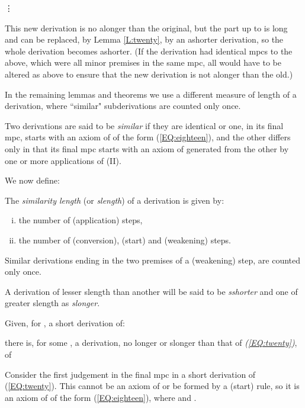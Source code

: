 \documentclass{LMCS}
\begin{document}
\begin{thm}
{{\hspace {7cm}\vdots

}

 \noindent This new derivation is no alonger than the original, but
  the part up to 
  is long and can be replaced, by Lemma \ref{L:twenty}, by an ashorter
  derivation, so the whole derivation becomes ashorter. (If the
  derivation had identical mpcs to the above, which were all minor
  premises in the same mpc, all would have to be altered as above to
  ensure that the new derivation is not alonger than the old.)

  In the remaining lemmas and theorems we use a different measure of
  length of a derivation, where ``similar" subderivations are counted
  only once.

\begin{defi}[Similar]\label{D:sim}
  Two derivations are said to be  \emph{similar} if they are identical
  or one, in its final mpc, starts with an axiom of  of
  the form (\ref{EQ:eighteen}), and the other differs only in that its
  final mpc starts with an axiom of  generated from the
  other by one or more applications of (II).
\end{defi}

  We now define:

\begin{defi}\label{D:simlen}
  The  \emph{similarity length} (or  \emph{slength}) of a derivation is
  given by:
\begin{enumerate}[(i)]
\item the number of (application) steps,
\item the number of (conversion), (start) and (weakening) steps.
\end{enumerate}
  Similar derivations ending in the two premises of a (weakening)
  step, are counted only once.

  A derivation of lesser slength than another will be said to be
  \emph{sshorter} and one of greater slength as  \emph{slonger}.
\end{defi}

\begin{lem}\label{L:twentytwo} Given, for , a
  short derivation of:

  there is, for some , a derivation, no longer or
  slonger than that of \emph{(\ref{EQ:twenty})}, of

\end{lem}

\proof Consider the first judgement in the final mpc in a short
  derivation of (\ref{EQ:twenty}). This cannot be an axiom of  or be formed by a (start) rule, so it is an axiom of  of the form (\ref{EQ:eighteen}), where 
  and .

}
\end{thm}
\end{document}
